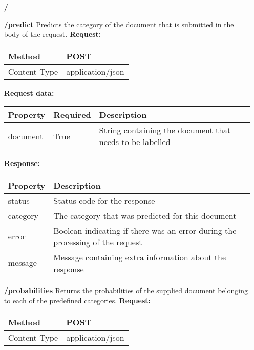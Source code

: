 \begin{enumerate}
\item[\textbf{/}]\\
\item[\textbf{/predict}]
\newline
\newline
Predicts the category of the document that is submitted in the body of the request.
\newline
\newline
\textbf{Request:}
\newline
\newline
\begin{tabular}{ | l | l |}
\hline
Method & POST\\ \hline
Content-Type & application/json\\ \hline
\end{tabular}
\newline
\newline
\textbf{Request data:}
\newline
\newline
\begin{tabular}{ | l | l | l |}
\hline
Property & Required & Description\\ \hline
document & True & String containing the document that needs to be labelled\\ \hline
\end{tabular}

\textbf{Response:}
\newline
\newline
\begin{tabular}{ | l | l |}
\hline
Property & Description\\ \hline
status & Status code for the response\\ \hline
category & The category that was predicted for this document\\ \hline
error & Boolean indicating if there was an error during the processing of the request\\ \hline
message & Message containing extra information about the response\\ \hline

\end{tabular}

\item[\textbf{/probabilities}]
\newline
\newline
Returns the probabilities of the supplied document belonging to each of the predefined categories. 
\newline
\newline
\textbf{Request:}
\newline
\newline
\begin{tabular}{ | l | l |}
\hline
Method & POST\\ \hline
Content-Type & application/json\\ \hline
\end{tabular}
\\



\end{enumerate}
